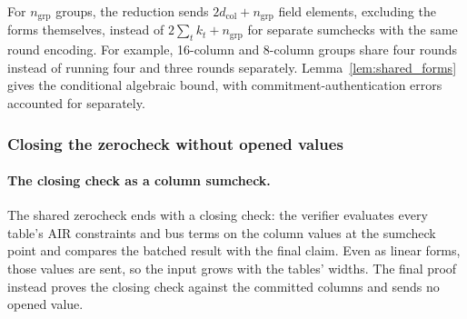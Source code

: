 \documentclass[11pt]{article}
\begin{document}
For $n_{\mathrm{grp}}$ groups, the reduction sends
$2d_{\mathrm{col}}+n_{\mathrm{grp}}$ field elements, excluding the forms
themselves, instead of $2\sum_t k_t+n_{\mathrm{grp}}$ for separate
sumchecks with the same round encoding. For example, 16-column and
8-column groups share four rounds instead of running four and three
rounds separately. Lemma~\ref{lem:shared_forms} gives
the conditional algebraic bound, with commitment-authentication errors
accounted for separately.

\subsubsection{Closing the zerocheck without opened values}\label{sec:closing}

\paragraph{The closing check as a column sumcheck.} The shared zerocheck ends
with a closing check: the verifier evaluates every table's AIR constraints and
bus terms on the column values at the sumcheck point and compares the batched
result with the final claim. Even as linear forms, those values are sent, so
the input grows with the tables' widths. The final proof instead proves the
closing check against the committed columns and sends no opened value.
\end{document}
